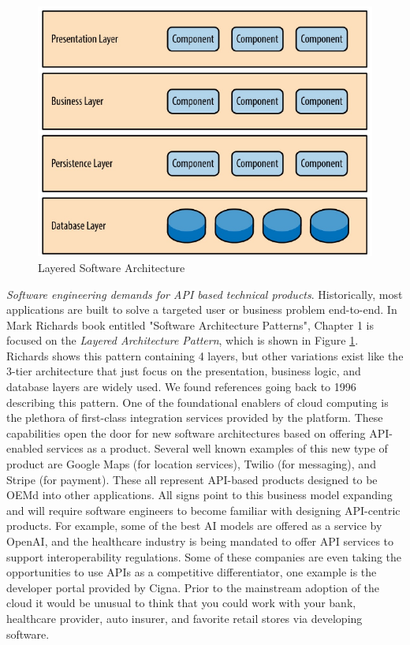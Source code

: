 \documentclass[conference]{IEEEconf}
\begin{document}
\begin{figure}
	\includegraphics[width=\columnwidth]{images/LayeredArchitecture}	
	\caption{Layered Software Architecture}
	\label{fig:LayeredArchitecture}
\end{figure}

\textit{Software engineering demands for API based technical products}.  Historically, most applications are built to solve a targeted user or business problem end-to-end.  In Mark Richards book entitled "Software Architecture Patterns"\cite{richards2015software}, Chapter 1 is focused on the \textit{Layered Architecture Pattern}, which is shown in Figure \ref{fig:LayeredArchitecture}. Richards shows this pattern containing 4 layers, but other variations exist like the 3-tier architecture that just focus on the presentation, business logic, and database layers are widely used. We found references going back to 1996\cite{aarsten1996patterns} describing this pattern. One of the foundational enablers of cloud computing is the plethora of first-class integration services provided by the platform. These capabilities open the door for new software architectures based on offering API-enabled services as a product. Several well known examples of this new type of product are Google Maps (for location services), Twilio (for messaging), and Stripe (for payment). These all represent API-based products designed to be OEMd into other applications. All signs point to this business model expanding and will require software engineers to become familiar with designing API-centric products.  For example, some of the best AI models are offered as a service by OpenAI\cite{OpenAI}, and the healthcare industry is being mandated to offer API services to support interoperability\cite{FHIRAPI} regulations.  Some of these companies are even taking the opportunities to use APIs as a competitive differentiator, one example is the developer portal provided by Cigna\cite{CignaDeveloper}. Prior to the mainstream adoption of the cloud it would be unusual to think that you could work with your bank, healthcare provider, auto insurer, and favorite retail stores via developing software. 
\end{document}
